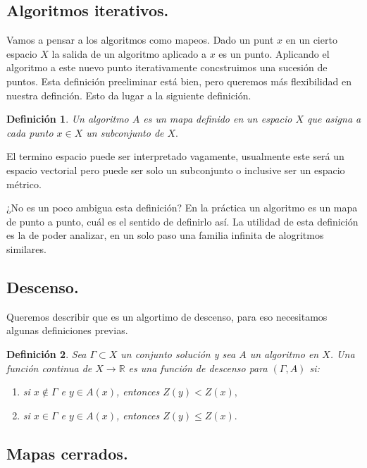 \documentclass[11pt]{article}
\theoremstyle{ejstyle}
\theoremstyle{ejstyle}
\newtheorem{definicion}{Definición}
\theoremstyle{ejstyle}
\theoremstyle{ejstyle}
\theoremstyle{ejstyle}
\theoremstyle{ejstyle}
\theoremstyle{ejstyle}
\begin{document}
	\subsection{Algoritmos iterativos.}
	
	Vamos a pensar a los algoritmos como mapeos. Dado un punt $x$ en un cierto espacio $X$ 
	la salida de un algoritmo aplicado a $x$ es un punto. Aplicando el algoritmo a este nuevo 
	punto iterativamente concstruimos una sucesión de puntos. Esta definición preeliminar está bien, pero
	queremos más flexibilidad en nuestra definción. Esto da lugar a la siguiente definición.
	
	\begin{definicion}
		Un algoritmo $A$ es un mapa definido en un espacio $X$ que asigna a cada punto $x \in X$
		un subconjunto de $X.$
	\end{definicion}
	
	El termino espacio puede ser interpretado vagamente, usualmente este será un espacio vectorial
	pero puede ser solo un subconjunto o inclusive ser un espacio métrico.
	
	¿No es un poco ambigua esta definición? En la práctica un algoritmo es un mapa de punto a punto, cuál
	es el sentido de definirlo así. La utilidad de esta definición es la de poder analizar, en un solo 
	paso una familia infinita de alogritmos similares.
	
	\subsection{Descenso.}
	
	Queremos describir que es un algortimo de descenso, para eso necesitamos algunas definiciones previas.
	
	\begin{definicion}
		Sea $\Gamma \subset X$ un conjunto solución y sea $A$ un algoritmo en $X$. Una función continua de $X \to \mathbb{R}$ es una \emph{función de descenso} para $(\Gamma, A)$ si:
		
		\begin{enumerate}
			\item si $x \notin \Gamma$ e $y \in A(x)$, entonces $Z(y) < Z(x),$
			\item si $x \in \Gamma$ e $y \in A(x)$, entonces $Z(y) \leq Z(x).$
		\end{enumerate}
		
	\end{definicion}
	
	\subsection{Mapas cerrados.}
	
\end{document}
